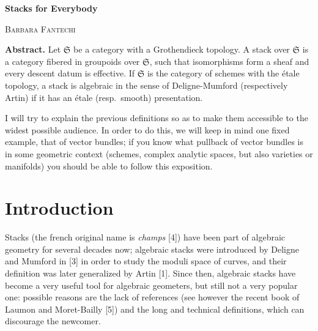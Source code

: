 \documentclass[12pt]{memoir}
\begin{document}

\begin{center}
{\LARGE\bfseries Stacks for Everybody}
\end{center}

\vspace{1em}

\begin{flushleft}
{\large\textsc{Barbara Fantechi}}
\end{flushleft}

\vspace{1em}

\noindent\textbf{Abstract.} Let $\mathfrak{S}$ be a category with a Grothendieck topology. A stack over $\mathfrak{S}$ is a category fibered in groupoids over $\mathfrak{S}$, such that isomorphisms form a sheaf and every descent datum is effective. If $\mathfrak{S}$ is the category of schemes with the \'etale topology, a stack is algebraic in the sense of Deligne-Mumford (respectively Artin) if it has an \'etale (resp.\ smooth) presentation.

I will try to explain the previous definitions so as to make them accessible to the widest possible audience. In order to do this, we will keep in mind one fixed example, that of vector bundles; if you know what pullback of vector bundles is in some geometric context (schemes, complex analytic spaces, but also varieties or manifolds) you should be able to follow this exposition.

\let\thefootnote\relax{}

\section{Introduction}

Stacks (the french original name is \emph{champs} [4]) have been part of algebraic geometry for several decades now; algebraic stacks were introduced by Deligne and Mumford in [3] in order to study the moduli space of curves, and their definition was later generalized by Artin [1]. Since then, algebraic stacks have become a very useful tool for algebraic geometers, but still not a very popular one: possible reasons are the lack of references (see however the recent book of Laumon and Moret-Bailly [5]) and the long and technical definitions, which can discourage the newcomer.
\end{document}
